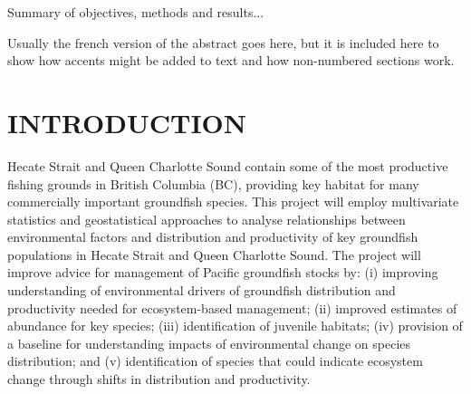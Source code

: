 \documentclass[11pt]{book}\usepackage[]{graphicx}\usepackage[]{color}
\begin{document}



\setcounter{secnumdepth}{5} %

\renewcommand{\thesection}{\arabic{section}}
\renewcommand{\thetable}{\arabic{table}}
\renewcommand{\thefigure}{\arabic{figure}}
\renewcommand{\theequation}{\arabic{equation}}




Summary of objectives, methods and results...

\newpage


Usually the french version of the abstract goes here, but it is included here to show how accents might be added to text and how non-numbered sections work.

\clearpage

\setcounter{page}{1}

\section{INTRODUCTION}
Hecate Strait and Queen Charlotte Sound contain some of the most productive fishing grounds in British Columbia (BC), providing key habitat for many commercially important groundfish species. This project will employ multivariate statistics and geostatistical approaches to analyse relationships between environmental factors and distribution and productivity of key groundfish populations in Hecate Strait and Queen Charlotte Sound. The project will improve advice for management of Pacific groundfish stocks by: (i) improving understanding of environmental drivers of groundfish distribution and productivity needed for ecosystem-based management; (ii) improved estimates of abundance for key species; (iii) identification of juvenile habitats;  (iv) provision of a baseline for understanding impacts of environmental change on species distribution; and (v) identification of species that could indicate ecosystem change through shifts in distribution and productivity.
\end{document}
